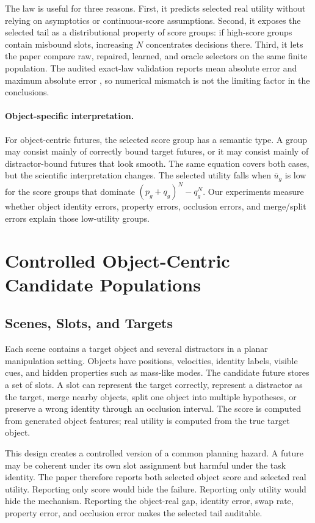 \documentclass[10pt]{article}
\begin{document}
The law is useful for three reasons. First, it predicts selected real utility without relying on asymptotics or continuous-score assumptions. Second, it exposes the selected tail as a distributional property of score groups: if high-score groups contain misbound slots, increasing $N$ concentrates decisions there. Third, it lets the paper compare raw, repaired, learned, and oracle selectors on the same finite population. The audited exact-law validation reports mean absolute error \VThreeExactMeanMae{} and maximum absolute error \VThreeExactMaxError{}, so numerical mismatch is not the limiting factor in the conclusions.

\paragraph{Object-specific interpretation.}
For object-centric futures, the selected score group has a semantic type. A group may consist mainly of correctly bound target futures, or it may consist mainly of distractor-bound futures that look smooth. The same equation covers both cases, but the scientific interpretation changes. The selected utility falls when $\bar{u}_g$ is low for the score groups that dominate $(p_g+q_g)^N-q_g^N$. Our experiments measure whether object identity errors, property errors, occlusion errors, and merge/split errors explain those low-utility groups.

\section{Controlled Object-Centric Candidate Populations}

\subsection{Scenes, Slots, and Targets}

Each scene contains a target object and several distractors in a planar manipulation setting. Objects have positions, velocities, identity labels, visible cues, and hidden properties such as mass-like modes. The candidate future stores a set of slots. A slot can represent the target correctly, represent a distractor as the target, merge nearby objects, split one object into multiple hypotheses, or preserve a wrong identity through an occlusion interval. The score is computed from generated object features; real utility is computed from the true target object.

This design creates a controlled version of a common planning hazard. A future may be coherent under its own slot assignment but harmful under the task identity. The paper therefore reports both selected object score and selected real utility. Reporting only score would hide the failure. Reporting only utility would hide the mechanism. Reporting the object-real gap, identity error, swap rate, property error, and occlusion error makes the selected tail auditable.
\end{document}
